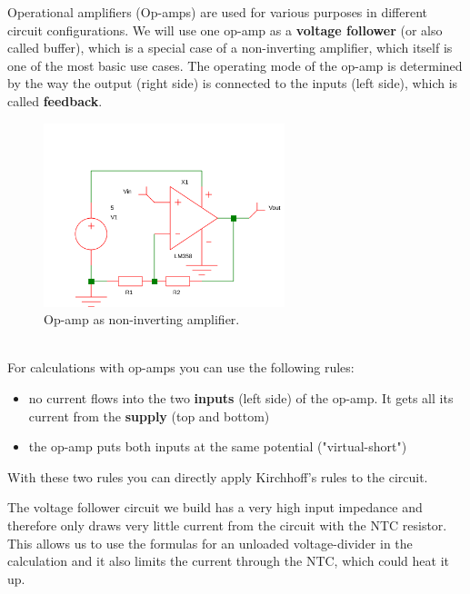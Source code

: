 Operational amplifiers (Op-amps) are used for various purposes in different circuit configurations. We will use one op-amp as a \textbf{voltage follower} (or also called buffer), which is a special case of a non-inverting amplifier, which itself is one of the most basic use cases. The operating mode of the op-amp is determined by the way the output (right side) is connected to the inputs (left side), which is called \textbf{feedback}.

\begin{figure}[H]
\begin{center}
\includegraphics[width=7cm]{opamp}
\caption{Op-amp as non-inverting amplifier.}\label{fig:opamp}
\end{center}
\end{figure}

\vspace{0.5cm}\\
For calculations with op-amps you can use the following rules:
\begin{itemize}
\item no current flows into the two \textbf{inputs} (left side) of the op-amp. It gets all its current from the \textbf{supply} (top and bottom)
\item the op-amp puts both inputs at the same potential ("virtual-short")
\end{itemize}

With these two rules you can directly apply Kirchhoff's rules to the circuit. 

The voltage follower circuit we build has a very high input impedance and therefore only draws very little current from the circuit with the NTC resistor. This allows us to use the formulas for an unloaded voltage-divider in the calculation and it also limits the current through the NTC, which could heat it up.

